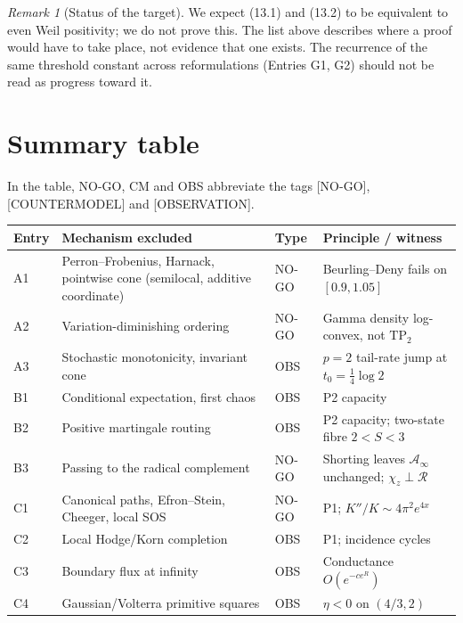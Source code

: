 \documentclass[11pt]{amsart}
\theoremstyle{definition}
\theoremstyle{remark}
\newtheorem{remark}[theorem]{Remark}
\newcommand{\NOGO}{\textup{[NO-GO]}}
\newcommand{\CTMD}{\textup{[COUNTERMODEL]}}
\newcommand{\OBS}{\textup{[OBSERVATION]}}
\begin{document}
\begin{remark}[Status of the target]
We expect (13.1) and (13.2) to be equivalent to even Weil positivity; we
do not prove this.  The list above describes where a proof would have to
take place, not evidence that one exists.  The recurrence of the same
threshold constant across reformulations (Entries G1, G2) should not be
read as progress toward it.
\end{remark}

\section{Summary table}

In the table, NO-GO, CM and OBS abbreviate the tags \NOGO, \CTMD{} and
\OBS.

\begin{center}
\small
\begin{longtable}{>{\raggedright\arraybackslash}p{}
                  >{\raggedright\arraybackslash}p{}
                  >{\raggedright\arraybackslash}p{}
                  >{\raggedright\arraybackslash}p{}}
\toprule
Entry & Mechanism excluded & Type & Principle / witness\\
\midrule
\endhead
A1 & Perron--Frobenius, Harnack, pointwise cone (semilocal, additive coordinate) & NO-GO & Beurling--Deny fails on \([0.9,1.05]\)\\
A2 & Variation-diminishing ordering & NO-GO & Gamma density log-convex, not \(\mathrm{TP}_2\)\\
A3 & Stochastic monotonicity, invariant cone & OBS & \(p=2\) tail-rate jump at \(t_0=\frac14\log2\)\\
B1 & Conditional expectation, first chaos & OBS & P2 capacity\\
B2 & Positive martingale routing & OBS & P2 capacity; two-state fibre \(2<S<3\)\\
B3 & Passing to the radical complement & NO-GO & Shorting leaves \(\mathcal A_\infty\) unchanged; \(\chi_z\perp\mathcal R\)\\
C1 & Canonical paths, Efron--Stein, Cheeger, local SOS & NO-GO & P1; \(K''/K\sim4\pi^2e^{4x}\)\\
C2 & Local Hodge/Korn completion & OBS & P1; incidence cycles\\
C3 & Boundary flux at infinity & OBS & Conductance \(O(e^{-ce^R})\)\\
C4 & Gaussian/Volterra primitive squares & OBS & \(\eta<0\) on \((4/3,2)\)\\

\end{longtable}
\end{center}
\end{document}
